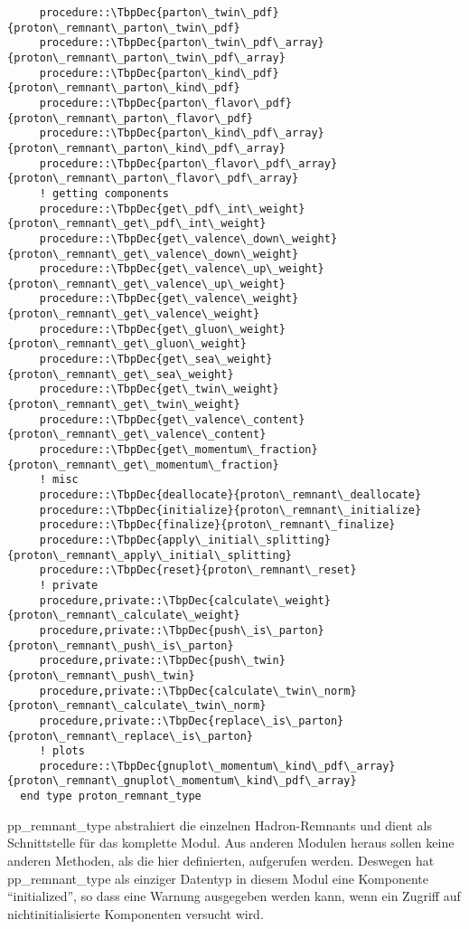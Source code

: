 \begin{Verbatim}
     procedure::\TbpDec{parton\_twin\_pdf}{proton\_remnant\_parton\_twin\_pdf}
     procedure::\TbpDec{parton\_twin\_pdf\_array}{proton\_remnant\_parton\_twin\_pdf\_array}
     procedure::\TbpDec{parton\_kind\_pdf}{proton\_remnant\_parton\_kind\_pdf}
     procedure::\TbpDec{parton\_flavor\_pdf}{proton\_remnant\_parton\_flavor\_pdf}
     procedure::\TbpDec{parton\_kind\_pdf\_array}{proton\_remnant\_parton\_kind\_pdf\_array}
     procedure::\TbpDec{parton\_flavor\_pdf\_array}{proton\_remnant\_parton\_flavor\_pdf\_array}
     ! getting components
     procedure::\TbpDec{get\_pdf\_int\_weight}{proton\_remnant\_get\_pdf\_int\_weight}
     procedure::\TbpDec{get\_valence\_down\_weight}{proton\_remnant\_get\_valence\_down\_weight}
     procedure::\TbpDec{get\_valence\_up\_weight}{proton\_remnant\_get\_valence\_up\_weight}
     procedure::\TbpDec{get\_valence\_weight}{proton\_remnant\_get\_valence\_weight}
     procedure::\TbpDec{get\_gluon\_weight}{proton\_remnant\_get\_gluon\_weight}
     procedure::\TbpDec{get\_sea\_weight}{proton\_remnant\_get\_sea\_weight}
     procedure::\TbpDec{get\_twin\_weight}{proton\_remnant\_get\_twin\_weight}
     procedure::\TbpDec{get\_valence\_content}{proton\_remnant\_get\_valence\_content}
     procedure::\TbpDec{get\_momentum\_fraction}{proton\_remnant\_get\_momentum\_fraction}
     ! misc
     procedure::\TbpDec{deallocate}{proton\_remnant\_deallocate}
     procedure::\TbpDec{initialize}{proton\_remnant\_initialize}
     procedure::\TbpDec{finalize}{proton\_remnant\_finalize}
     procedure::\TbpDec{apply\_initial\_splitting}{proton\_remnant\_apply\_initial\_splitting}
     procedure::\TbpDec{reset}{proton\_remnant\_reset}
     ! private
     procedure,private::\TbpDec{calculate\_weight}{proton\_remnant\_calculate\_weight}
     procedure,private::\TbpDec{push\_is\_parton}{proton\_remnant\_push\_is\_parton}
     procedure,private::\TbpDec{push\_twin}{proton\_remnant\_push\_twin}
     procedure,private::\TbpDec{calculate\_twin\_norm}{proton\_remnant\_calculate\_twin\_norm}
     procedure,private::\TbpDec{replace\_is\_parton}{proton\_remnant\_replace\_is\_parton}
     ! plots
     procedure::\TbpDec{gnuplot\_momentum\_kind\_pdf\_array}{proton\_remnant\_gnuplot\_momentum\_kind\_pdf\_array}
  end type proton_remnant_type
\end{Verbatim}
pp\_remnant\_type abstrahiert die einzelnen Hadron-Remnants und dient als Schnittstelle für das komplette Modul. Aus anderen Modulen heraus sollen keine anderen Methoden, als die hier definierten, aufgerufen werden. Deswegen hat pp\_remnant\_type als einziger Datentyp in diesem Modul eine Komponente "`initialized"', so dass eine Warnung ausgegeben werden kann, wenn ein Zugriff auf nichtinitialisierte Komponenten versucht wird.

